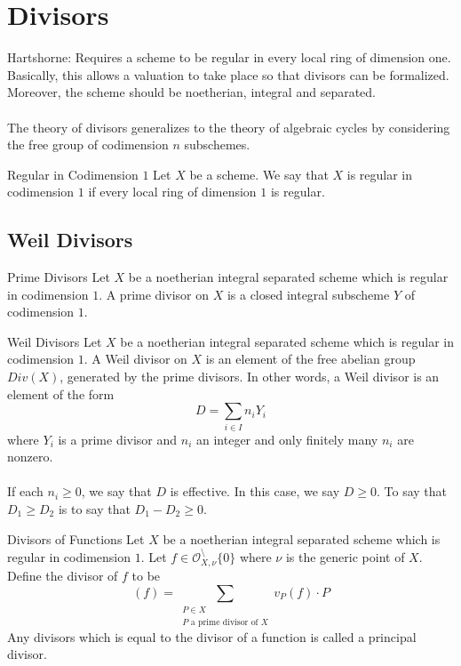 \documentclass[a4paper]{article}
\begin{document}
\pagebreak
\section{Divisors}
Hartshorne: Requires a scheme to be regular in every local ring of dimension one. Basically, this allows a valuation to take place so that divisors can be formalized. Moreover, the scheme should be noetherian, integral and separated. \\~\\
The theory of divisors generalizes to the theory of algebraic cycles by considering the free group of codimension $n$ subschemes. 



\begin{defn}{Regular in Codimension $1$}{} Let $X$ be a scheme. We say that $X$ is regular in codimension $1$ if every local ring of dimension $1$ is regular. 
\end{defn}

\subsection{Weil Divisors}
\begin{defn}{Prime Divisors}{} Let $X$ be a noetherian integral separated scheme which is regular in codimension $1$. A prime divisor on $X$ is a closed integral subscheme $Y$ of codimension $1$. 
\end{defn}

\begin{defn}{Weil Divisors}{} Let $X$ be a noetherian integral separated scheme which is regular in codimension $1$. A Weil divisor on $X$ is an element of the free abelian group $Div(X)$, generated by the prime divisors. In other words, a Weil divisor is an element of the form $$D=\sum_{i\in I}n_iY_i$$ where $Y_i$ is a prime divisor and $n_i$ an integer and only finitely many $n_i$ are nonzero. \\~\\
If each $n_i\geq 0$, we say that $D$ is effective. In this case, we say $D\geq 0$. To say that $D_1\geq D_2$ is to say that $D_1-D_2\geq 0$. 
\end{defn}

\begin{defn}{Divisors of Functions}{} Let $X$ be a noetherian integral separated scheme which is regular in codimension $1$. Let $f\in\mathcal{O}_{X,\nu}^\setminus\{0\}$ where $\nu$ is the generic point of $X$. Define the divisor of $f$ to be $$(f)=\sum_{\substack{P\in X\\P \text{ a prime divisor of }X}}v_P(f)\cdot P$$ Any divisors which is equal to the divisor of a function is called a principal divisor. 
\end{defn}
\end{document}
